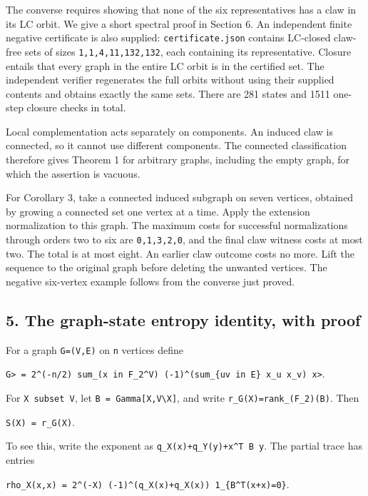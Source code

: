 \documentclass[
  11pt,
]{article}
\begin{document}
The converse requires showing that none of the six representatives has a
claw in its LC orbit. We give a short spectral proof in Section 6. An
independent finite negative certificate is also supplied:
\texttt{certificate.json} contains LC-closed claw-free sets of sizes
\texttt{1,1,4,11,132,132}, each containing its representative. Closure
entails that every graph in the entire LC orbit is in the certified set.
The independent verifier regenerates the full orbits without using their
supplied contents and obtains exactly the same sets. There are 281
states and 1511 one-step closure checks in total.

Local complementation acts separately on components. An induced claw is
connected, so it cannot use different components. The connected
classification therefore gives Theorem 1 for arbitrary graphs, including
the empty graph, for which the assertion is vacuous.

For Corollary 3, take a connected induced subgraph on seven vertices,
obtained by growing a connected set one vertex at a time. Apply the
extension normalization to this graph. The maximum costs for successful
normalizations through orders two to six are \texttt{0,1,3,2,0}, and the
final claw witness costs at most two. The total is at most eight. An
earlier claw outcome costs no more. Lift the sequence to the original
graph before deleting the unwanted vertices. The negative six-vertex
example follows from the converse just proved.

\subsection{5. The graph-state entropy identity, with
proof}\label{the-graph-state-entropy-identity-with-proof}

For a graph \texttt{G=(V,E)} on \texttt{n} vertices define

\texttt{\textbar{}G\textgreater{}\ =\ 2\^{}(-n/2)\ sum\_(x\ in\ F\_2\^{}V)\ (-1)\^{}(sum\_\{uv\ in\ E\}\ x\_u\ x\_v)\ \textbar{}x\textgreater{}}.

For \texttt{X\ subset\ V}, let
\texttt{B\ =\ Gamma{[}X,V\textbackslash{}X{]}}, and write
\texttt{r\_G(X)=rank\_(F\_2)(B)}. Then

\texttt{S(X)\ =\ r\_G(X)}.

To see this, write the exponent as
\texttt{q\_X(x)+q\_Y(y)+x\^{}T\ B\ y}. The partial trace has entries

\texttt{rho\_X(x,x\textquotesingle{})\ =\ 2\^{}(-\textbar{}X\textbar{})\ (-1)\^{}(q\_X(x)+q\_X(x\textquotesingle{}))\ 1\_\{B\^{}T(x+x\textquotesingle{})=0\}}.
\end{document}
